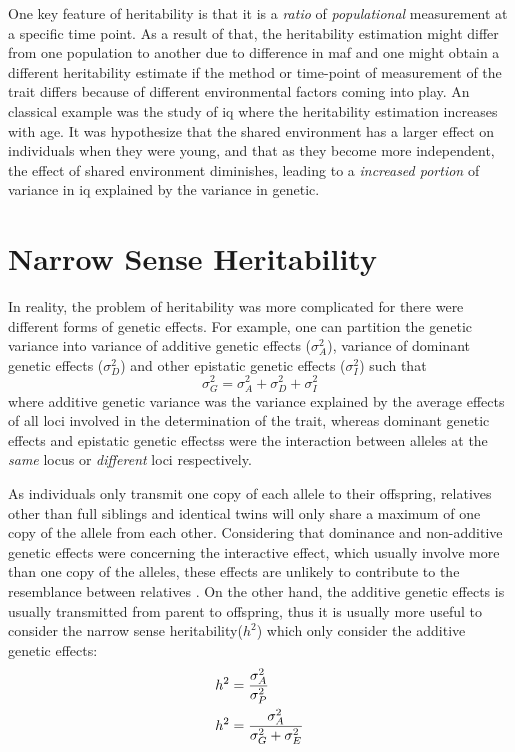 \documentclass[12pt]{book}
\begin{document}
	One key feature of heritability is that it is a \emph{ratio} of \emph{populational} measurement at a specific time point.
	As a result of that, the heritability estimation might differ from one population to another due to difference in \gls{maf} and one might obtain a different heritability estimate if the method or time-point of measurement of the trait differs because of different environmental factors coming into play.
	An classical example was the study of \gls{iq} where the heritability estimation increases with age\citep{Bouchard2013}.
	It was hypothesize that the shared environment has a larger effect on individuals when they were young, and that as they become more independent, the effect of shared environment diminishes, leading to a \emph{increased portion} of variance in \gls{iq} explained by the variance in genetic\citep{Bouchard2013}. 
	
	\section{Narrow Sense Heritability}
	In reality, the problem of heritability was more complicated for there were different forms of genetic effects. 
	For example, one can partition the genetic variance into variance of additive genetic effects ($\sigma_A^2$), variance of dominant genetic effects ($\sigma_D^2$) and other epistatic genetic effects ($\sigma_I^2$) such that
	$$
		\sigma_G^2=\sigma_A^2+\sigma_D^2+\sigma_I^2
	$$
	where additive genetic variance was the variance explained by the average effects of all loci involved in the determination of the trait, whereas dominant genetic effects and epistatic genetic effectss were the interaction between alleles at the \emph{same} locus or \emph{different} loci respectively.
	
	As individuals only transmit one copy of each allele to their offspring, relatives other than full siblings and identical twins will only share a maximum of one copy of the allele from each other.
	Considering that dominance and non-additive genetic effects were concerning the interactive effect, which usually involve more than one copy of the alleles, these effects are unlikely to contribute to the resemblance between relatives \citep{Visscher2008}.
	On the other hand, the additive genetic effects is usually transmitted from parent to offspring, thus it is usually more useful to consider the narrow sense heritability($h^2$) which only consider the additive genetic effects:
	\begin{align}
	h^2&=\frac{\sigma_A^2}{\sigma_P^2} \notag\\
	h^2&=\frac{\sigma_A^2}{\sigma_G^2+\sigma_E^2}
	\label{eq:narrowHeritability}
	\end{align}
	
\end{document}
